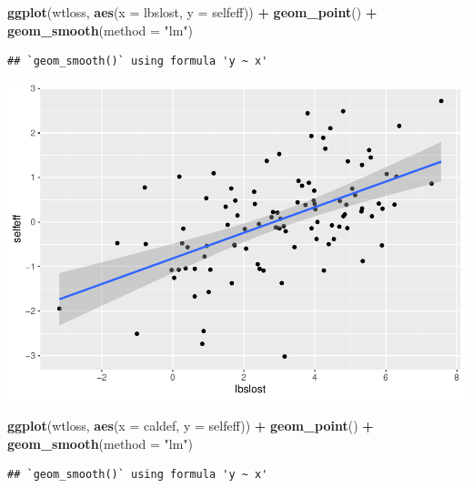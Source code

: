 \documentclass[]{article}
\newenvironment{Shaded}{\begin{snugshade}}{\end{snugshade}}
\newcommand{\KeywordTok}[1]{\textcolor[rgb]{0.13,0.29,0.53}{\textbf{#1}}}
\newcommand{\DataTypeTok}[1]{\textcolor[rgb]{0.13,0.29,0.53}{#1}}
\newcommand{\StringTok}[1]{\textcolor[rgb]{0.31,0.60,0.02}{#1}}
\newcommand{\OperatorTok}[1]{\textcolor[rgb]{0.81,0.36,0.00}{\textbf{#1}}}
\newcommand{\NormalTok}[1]{#1}
\begin{document}
\begin{Shaded}
\begin{Highlighting}[]
\KeywordTok{ggplot}\NormalTok{(wtloss, }\KeywordTok{aes}\NormalTok{(}\DataTypeTok{x =}\NormalTok{ lbslost, }\DataTypeTok{y =}\NormalTok{ selfeff)) }\OperatorTok{+}
\StringTok{  }\KeywordTok{geom_point}\NormalTok{() }\OperatorTok{+}
\StringTok{  }\KeywordTok{geom_smooth}\NormalTok{(}\DataTypeTok{method =} \StringTok{"lm"}\NormalTok{)}
\end{Highlighting}
\end{Shaded}

\begin{verbatim}
## `geom_smooth()` using formula 'y ~ x'
\end{verbatim}

\includegraphics{wtloss_notebook_files/figure-latex/unnamed-chunk-9-2.pdf}

\begin{Shaded}
\begin{Highlighting}[]
\KeywordTok{ggplot}\NormalTok{(wtloss, }\KeywordTok{aes}\NormalTok{(}\DataTypeTok{x =}\NormalTok{ caldef, }\DataTypeTok{y =}\NormalTok{ selfeff)) }\OperatorTok{+}
\StringTok{  }\KeywordTok{geom_point}\NormalTok{() }\OperatorTok{+}
\StringTok{  }\KeywordTok{geom_smooth}\NormalTok{(}\DataTypeTok{method =} \StringTok{"lm"}\NormalTok{)}
\end{Highlighting}
\end{Shaded}

\begin{verbatim}
## `geom_smooth()` using formula 'y ~ x'
\end{verbatim}
\end{document}
